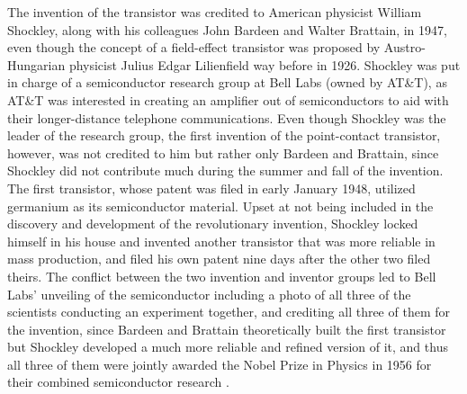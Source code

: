 \documentclass[10pt,letterpaper,onecolumn]{article}
\begin{document}
The invention of the transistor was credited to American physicist William Shockley, along with his colleagues John Bardeen and Walter Brattain, in 1947, even though the concept of a field-effect transistor was proposed by Austro-Hungarian physicist Julius Edgar Lilienfield way before in 1926. Shockley was put in charge of a semiconductor research group at Bell Labs (owned by AT\&T), as AT\&T was interested in creating an amplifier out of semiconductors to aid with their longer-distance telephone communications. Even though Shockley was the leader of the research group, the first invention of the point-contact transistor, however, was not credited to him but rather only Bardeen and Brattain, since Shockley did not contribute much during the summer and fall of the invention. The first transistor, whose patent was filed in early January 1948, utilized germanium as its semiconductor material. Upset at not being included in the discovery and development of the revolutionary invention, Shockley locked himself in his house and invented another transistor that was more reliable in mass production, and filed his own patent nine days after the other two filed theirs. The conflict between the two invention and inventor groups led to Bell Labs' unveiling of the semiconductor including a photo of all three of the scientists conducting an experiment together, and crediting all three of them for the invention, since Bardeen and Brattain theoretically built the first transistor but Shockley developed a much more reliable and refined version of it, and thus all three of them were jointly awarded the Nobel Prize in Physics in 1956 for their combined semiconductor research \cite{shockley}. \\
\end{document}
